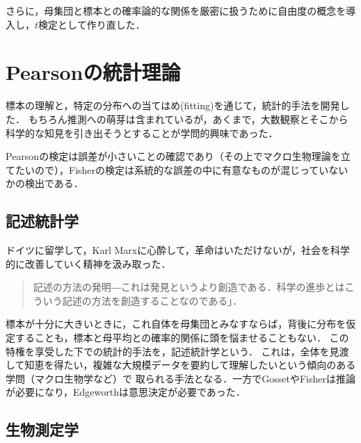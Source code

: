 \documentclass[uplatex,dvipdfmx]{jsreport}
\begin{document}
さらに，母集団と標本との確率論的な関係を厳密に扱うために自由度の概念を導入し，$t$検定として作り直した．

\section{Pearsonの統計理論}

\begin{tcolorbox}[colframe=ForestGreen, colback=ForestGreen!10!white,breakable,colbacktitle=ForestGreen!40!white,coltitle=black,fonttitle=\bfseries\sffamily,
title=]
    標本の理解と，特定の分布への当てはめ(fitting)を通じて，統計的手法を開発した．
    もちろん推測への萌芽は含まれているが，あくまで，大数観察とそこから科学的な知見を引き出そうとすることが学問的興味であった．

    Pearsonの検定は誤差が小さいことの確認であり（その上でマクロ生物理論を立てたいので），Fisherの検定は系統的な誤差の中に有意なものが混じっていないかの検出である．
\end{tcolorbox}

\subsection{記述統計学}

\begin{tcolorbox}[colframe=ForestGreen, colback=ForestGreen!10!white,breakable,colbacktitle=ForestGreen!40!white,coltitle=black,fonttitle=\bfseries\sffamily,
title=]
    ドイツに留学して，Karl Marxに心酔して，革命はいただけないが，社会を科学的に改善していく精神を汲み取った．
\end{tcolorbox}

\begin{quote}
    記述の方法の発明―これは発見というより創造である．科学の進歩とはこういう記述の方法を創造することなのである」．
\end{quote}

標本が十分に大きいときに，これ自体を母集団とみなすならば，背後に分布を仮定することも，標本と母平均との確率的関係に頭を悩ませることもない．
この特権を享受した下での統計的手法を，記述統計学という．
これは，全体を見渡して知恵を得たい，複雑な大規模データを要約して理解したいという傾向のある学問（マクロ生物学など）で
取られる手法となる．一方でGossetやFisherは推論が必要になり，Edgeworthは意思決定が必要であった．

\subsection{生物測定学}
\end{document}
